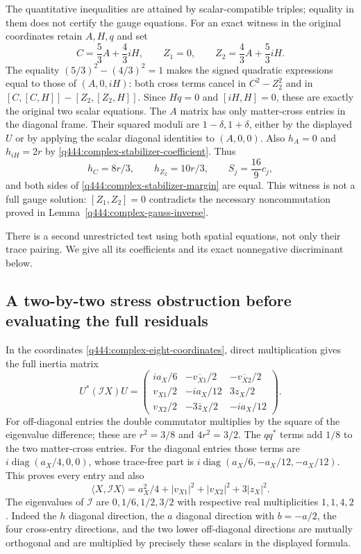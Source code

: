 The quantitative inequalities are attained by scalar-compatible
triples; equality in them does not certify the gauge equations.
For an exact witness in the original coordinates retain $A,H,q$ and set
\[
C=\frac53A+\frac43iH,\qquad Z_1=0,\qquad
Z_2=\frac43A+\frac53iH.
\]
The equality $(5/3)^2-(4/3)^2=1$ makes the signed quadratic expressions
equal to those of $(A,0,iH)$: both cross terms cancel in
$C^2-Z_2^2$ and in $[C,[C,H]]-[Z_2,[Z_2,H]]$.
Since $Hq=0$ and $[iH,H]=0$, these are exactly the original two scalar
equations. The $A$ matrix has only matter-cross entries in the diagonal
frame. Their squared moduli are $1-\delta,1+\delta$, either by the
displayed $U$ or by applying the scalar diagonal identities to
$(A,0,0)$. Also $h_A=0$ and $h_{iH}=2r$ by
\eqref{q444:complex-stabilizer-coefficient}. Thus
\[
h_C=8r/3,\qquad h_{Z_2}=10r/3,\qquad
S_j=\frac{16}{9}c_j,
\]
and both sides of \eqref{q444:complex-stabilizer-margin} are equal.
This witness is not a full gauge solution: $[Z_1,Z_2]=0$ contradicts
the necessary noncommutation proved in
Lemma~\ref{q444:complex-gauss-inverse}.

There is a second unrestricted test using both spatial equations, not
only their trace pairing. We give all its coefficients and its exact
nonnegative discriminant below.

\subsection{A two-by-two stress obstruction before evaluating the full residuals}
\label{q444:complex-stress-section}

In the coordinates \eqref{q444:complex-eight-coordinates}, direct
multiplication gives the full inertia matrix
\begin{equation}
U^*(\mathcal IX)U=
\begin{pmatrix}
ia_X/6&-\overline{v_{X1}}/2&-\overline{v_{X2}}/2\\
v_{X1}/2&-ia_X/12&3z_X/2\\
v_{X2}/2&-3\bar z_X/2&-ia_X/12
\end{pmatrix}.
\label{q444:complex-full-inertia-coordinates}
\end{equation}
For off-diagonal entries the double commutator multiplies by the square
of the eigenvalue difference; these are $r^2=3/8$ and $4r^2=3/2$.
The $qq^*$ terms add $1/8$ to the two matter-cross entries.
For the diagonal entries those terms are $i\operatorname{diag}(a_X/4,0,0)$,
whose trace-free part is $i\operatorname{diag}(a_X/6,-a_X/12,-a_X/12)$.
This proves every entry and also
\[
\langle X,\mathcal IX\rangle
=a_X^2/4+|v_{X1}|^2+|v_{X2}|^2+3|z_X|^2.
\]
The eigenvalues of $\mathcal I$ are $0,1/6,1/2,3/2$ with respective
real multiplicities $1,1,4,2$. Indeed the $h$ diagonal direction, the
$a$ diagonal direction with $b=-a/2$, the four cross-entry directions,
and the two lower off-diagonal directions are mutually orthogonal and
are multiplied by precisely these scalars in the displayed formula.

